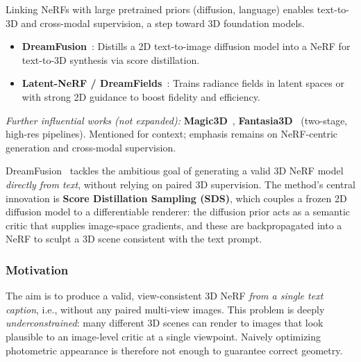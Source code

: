 \begin{enrichment}
    Linking NeRFs with large pretrained priors (diffusion, language) enables text-to-3D and cross-modal supervision, a step toward 3D foundation models.
    
    \begin{itemize}
        \item \textbf{DreamFusion}~\cite{poole2022_dreamfusion}: Distills a 2D text-to-image diffusion model into a NeRF for text-to-3D synthesis via score distillation.
        \item \textbf{Latent-NeRF / DreamFields}~\cite{metzer2022_latentnerf,jain2022_dreamfields}: Trains radiance fields in latent spaces or with strong 2D guidance to boost fidelity and efficiency.
    \end{itemize}
    
    \noindent\textit{Further influential works (not expanded):} \textbf{Magic3D}~\cite{lin2023_magic3d}, \textbf{Fantasia3D}~\cite{chen2023_fantasia3d} (two-stage, high-res pipelines). Mentioned for context; emphasis remains on NeRF-centric generation and cross-modal supervision.
    
    \begin{enrichment}
        \label{enr:chapter23_dreamfusion}
        
        DreamFusion~\cite{poole2022_dreamfusion} tackles the ambitious goal of generating a valid 3D NeRF model \emph{directly from text}, without relying on paired 3D supervision. The method’s central innovation is \textbf{Score Distillation Sampling (SDS)}, which couples a frozen 2D diffusion model to a differentiable renderer: the diffusion prior acts as a semantic critic that supplies image-space gradients, and these are backpropagated into a NeRF to sculpt a 3D scene consistent with the text prompt.
        
        \subsubsection{Motivation}
        \label{subsec:chapter23_dreamfusion_motivation}
        The aim is to produce a valid, view-consistent 3D NeRF \emph{from a single text caption}, i.e., without any paired multi-view images. This problem is deeply \emph{underconstrained}: many different 3D scenes can render to images that look plausible to an image-level critic at a single viewpoint. Naively optimizing photometric appearance is therefore not enough to guarantee correct geometry.
        

\end{enrichment}
\end{enrichment}

